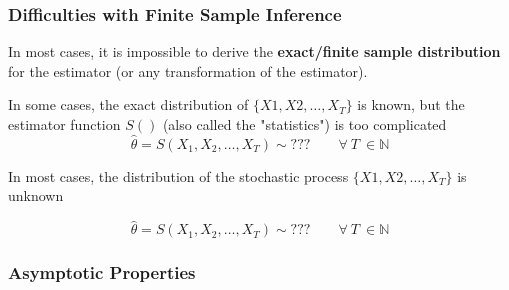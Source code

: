 \documentclass{beamer}
\newenvironment{wideenumerate}{\enumerate\addtolength{\itemsep}{10pt}}{\endenumerate}
\begin{document}
  \begin{frame}
    \frametitle{Difficulties with Finite Sample Inference}
    In most cases, it is impossible to derive the \textbf{exact/finite sample distribution} for the estimator (or any transformation of the estimator).

    \begin{wideenumerate}
    \item In some cases, the exact distribution of $\{ X1, X2, \dots, X_T\}$ is known, but the estimator function $S()$ (also called the "statistics") is too complicated
      \begin{equation*}
        \hat{\theta} = S(X_1, X_2, \dots, X_T) \sim ??? \qquad \forall \ T \ \in \mathbb{N}
      \end{equation*}

      \item In most cases, the distribution of the stochastic process $\{X1, X2, \dots, X_T\}$ is unknown

      \begin{equation*}
        \hat{\theta} = S(X_1, X_2, \dots, X_T) \sim ??? \qquad \forall \ T \ \in \mathbb{N}
      \end{equation*}
        
    \end{wideenumerate}
    
  \end{frame}
  


  \begin{frame}
    \frametitle{Asymptotic Properties}
    
  \end{frame}
  
  
\end{document}
